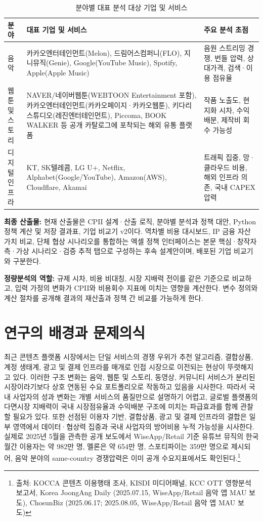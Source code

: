 \documentclass[11pt,a4paper]{report}
\newcommand{\sourcefootnote}[1]{\footnote{출처: #1}}
\newcommand{\srcKJADMusic}{Korea JoongAng Daily (2025.07.15, WiseApp/Retail 음악 앱 MAU 보도)}
\newcommand{\srcChosunBizMusic}{ChosunBiz (2025.06.17; 2025.08.05, WiseApp/Retail 음악 앱 MAU 보도)}
\begin{document}
\begin{table}[H]
  \centering
  \small
  \caption{분야별 대표 분석 대상 기업 및 서비스}\label{tab:sector_company_map}
  \begin{tabular}{L{2.3cm}L{7.9cm}L{4.4cm}}
    \toprule
    분야 & 대표 기업 및 서비스 & 주요 분석 초점 \\
    \midrule
    음악 & 카카오엔터테인먼트(Melon), 드림어스컴퍼니(FLO), 지니뮤직(Genie), Google(YouTube Music), Spotify, Apple(Apple Music) & 음원 스트리밍 경쟁, 번들 압력, 상대가격, 검색·이용 점유율 \\
    \midrule
    웹툰 및 스토리 & NAVER/네이버웹툰(WEBTOON Entertainment 포함), 카카오엔터테인먼트(카카오페이지·카카오웹툰), 키다리스튜디오(레진엔터테인먼트), Piccoma, BOOK WALKER 등 공개 카탈로그에 포착되는 해외 유통 플랫폼 & 작품 노출도, 현지화 시차, 수익배분, 제작비 회수 가능성 \\
    \midrule
    디지털 인프라 & KT, SK텔레콤, LG U+, Netflix, Alphabet(Google/YouTube), Amazon(AWS), Cloudflare, Akamai & 트래픽 집중, 망·클라우드 비용, 해외 인프라 의존, 국내 CAPEX 압력 \\
    \bottomrule
  \end{tabular}
\end{table}

\textbf{최종 산출물:} 현재 산출물은 CPII 설계·산출 로직, 분야별 분석과 정책 대안, Python 정책 계산 및 저장 결과표, 기업 비교기 v2이다. 역차별 비용 대시보드, IP 금융 자산 가치 비교, 단체 협상 시나리오를 통합하는 엑셀 정책 인터페이스는 본문 핵심·창작자 측·가상 시나리오·검증 추적 탭으로 구성하는 후속 설계안이며, 배포된 기업 비교기와 구분한다.

\textbf{정량분석의 역할:} 규제 시차, 비용 비대칭, 시장 지배력 전이를 같은 기준으로 비교하고, 입력 가정의 변화가 CPII와 비용회수 지표에 미치는 영향을 계산한다. 변수 정의와 계산 절차를 공개해 결과의 재산출과 정책 간 비교를 가능하게 한다.

\section{연구의 배경과 문제의식}
최근 콘텐츠 플랫폼 시장에서는 단일 서비스의 경쟁 우위가 추천 알고리즘, 결합상품, 계정 생태계, 광고 및 결제 인프라를 매개로 인접 시장으로 이전되는 현상이 뚜렷해지고 있다. 이러한 구조 변화는 음악, 웹툰 및 스토리, 동영상, 커뮤니티 서비스가 분리된 시장이라기보다 상호 연동된 수요 포트폴리오로 작동하고 있음을 시사한다. 따라서 국내 사업자의 성과 변화는 개별 서비스의 품질만으로 설명하기 어렵고, 글로벌 플랫폼의 다면시장 지배력이 국내 시장점유율과 수익배분 구조에 미치는 파급효과를 함께 관찰할 필요가 있다. 또한 선점된 이용자 기반, 결합상품, 광고 및 결제 인프라의 결합은 일부 영역에서 데이터·협상력 집중과 국내 사업자의 방어비용 누적 가능성을 시사한다. 실제로 2025년 5월을 관측한 공개 보도에서 WiseApp/Retail 기준 유튜브 뮤직의 한국 월간 이용자는 약 982만 명, 멜론은 약 654만 명, 스포티파이는 359만 명으로 제시되어, 음악 분야의 same-country 경쟁압력은 이미 공개 수요지표에서도 확인된다.\sourcefootnote{KOCCA 콘텐츠 이용행태 조사, KISDI 미디어패널, KCC OTT 영향분석 보고서, \srcKJADMusic, \srcChosunBizMusic}
\end{document}
